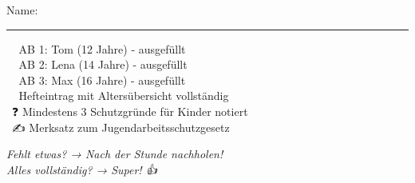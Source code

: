 \documentclass[12pt, a4paper]{article}
\newcommand{\checkbox}{\framebox[1em]{\phantom{X}}}
\begin{document}
\begin{center}
\begin{minipage}{0.48\textwidth}
\begin{framed}
                Name: \rule{8cm}{0.4pt}
                
                \vspace{0.3cm}
                
                \checkbox\ 📄 AB 1: Tom (12 Jahre) - ausgefüllt\\
                \checkbox\ 📄 AB 2: Lena (14 Jahre) - ausgefüllt\\
                \checkbox\ 📄 AB 3: Max (16 Jahre) - ausgefüllt\\
                \checkbox\ 📝 Hefteintrag mit Altersübersicht vollständig\\
                \checkbox\ ❓ Mindestens 3 Schutzgründe für Kinder notiert\\
                \checkbox\ ✍️ Merksatz zum Jugendarbeitsschutzgesetz
                
                \vspace{0.3cm}
                
                \textit{Fehlt etwas? → Nach der Stunde nachholen!}\\
                \textit{Alles vollständig? → Super! 👍}
            \end{framed}
        \end{minipage}
    \end{center}
\end{document}
